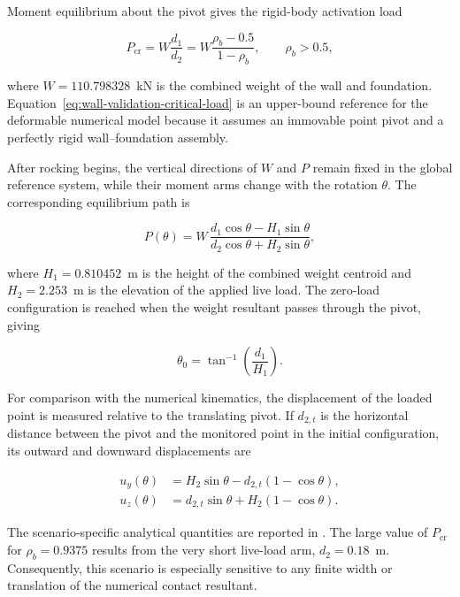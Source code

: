 Moment equilibrium about the pivot gives the rigid-body activation load

\begin{equation}
P_{\mathrm{cr}}=W\frac{d_1}{d_2}
=W\frac{\rho_b-0.5}{1-\rho_b},
\qquad \rho_b>0.5,
\label{eq:wall-validation-critical-load}
\end{equation}

where $W=110.798328$~kN is the combined weight of the wall and foundation.
Equation~\eqref{eq:wall-validation-critical-load} is an upper-bound reference
for the deformable numerical model because it assumes an immovable point
pivot and a perfectly rigid wall--foundation assembly.

After rocking begins, the vertical directions of $W$ and $P$ remain fixed in
the global reference system, while their moment arms change with the rotation
$\theta$. The corresponding equilibrium path is

\begin{equation}
P(\theta)=W\,
\frac{d_1\cos\theta-H_1\sin\theta}
{d_2\cos\theta+H_2\sin\theta},
\label{eq:wall-validation-rotation-path}
\end{equation}

where $H_1=0.810452$~m is the height of the combined weight centroid and
$H_2=2.253$~m is the elevation of the applied live load. The zero-load
configuration is reached when the weight resultant passes through the pivot,
giving

\begin{equation}
\theta_0=\tan^{-1}\left(\frac{d_1}{H_1}\right).
\label{eq:wall-validation-zero-rotation}
\end{equation}

For comparison with the numerical kinematics, the displacement of the loaded
point is measured relative to the translating pivot. If $d_{2,t}$ is the
horizontal distance between the pivot and the monitored point in the initial
configuration, its outward and downward displacements are

\begin{align}
u_y(\theta)&=H_2\sin\theta-d_{2,t}(1-\cos\theta),
\label{eq:wall-validation-horizontal-displacement}\\
u_z(\theta)&=d_{2,t}\sin\theta+H_2(1-\cos\theta).
\label{eq:wall-validation-vertical-displacement}
\end{align}

The scenario-specific analytical quantities are reported in
. The large value of
$P_{\mathrm{cr}}$ for $\rho_b=0.9375$ results from the very short live-load
arm, $d_2=0.18$~m. Consequently, this scenario is especially sensitive to any
finite width or translation of the numerical contact resultant.

